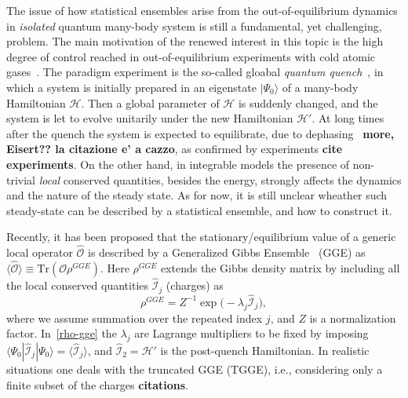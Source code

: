 \documentclass[twocolumn,superscriptaddress,prb,10pt]{revtex4-1}
\begin{document}
The issue of how statistical ensembles arise from the out-of-equilibrium 
dynamics in {\it isolated} quantum many-body system is still a fundamental, 
yet challenging, problem. The main motivation of the renewed interest 
in this topic is the high degree of control reached in out-of-equilibrium 
experiments with cold atomic gases~\cite{greiner-2002,kinoshita-2006,
hofferberth-2007,bloch-2008,trotzky-2012,gring-2012,cheneau-2012,
schneider-2012,kunhert-2013,langen-2013,meinert-2013,fukuhara-2013,
ronzheimer-2013,braun-2014}. 
The paradigm experiment is the so-called gloabal {\it quantum quench}~\cite{
polkovnikov-2011}, in which a system is initially prepared in an eigenstate 
$|\Psi_0\rangle$ of a many-body Hamiltonian ${\mathcal H}$. Then a global 
parameter of ${\mathcal H}$ is suddenly changed, and the system is let to evolve 
unitarily under the new Hamiltonian ${\mathcal H}'$. 
At long times after the quench the system is expected to equilibrate, due to 
dephasing~\cite{barthel-2008} {\bf more, Eisert??  la citazione e' a cazzo}, as confirmed by experiments {\bf cite experiments}. 
On the other hand, in integrable models the 
presence of non-trivial {\it local} conserved quantities, besides the energy, 
strongly affects the dynamics and the nature of the steady state. As for now,  
it is still unclear wheather such steady-state can be described by a statistical 
ensemble, and how to construct it. 

Recently, it has been proposed that the stationary/equilibrium value of a generic local 
operator $\hat{\mathcal O}$ is described by a Generalized Gibbs Ensemble~\cite{
rigol-2008} (GGE) as $\langle\hat{\mathcal O}\rangle\equiv\textrm{Tr}({\mathcal O}
\rho^{GGE})$. Here $\rho^{GGE}$ extends the Gibbs density matrix by including  all 
the local conserved quantities $\hat {\mathcal I}_j$ (charges) as 
%
\begin{equation}
\rho^{GGE}=Z^{-1}\exp\big(-\lambda_j\hat{\mathcal I}_j\big),
\label{rho-gge}
\end{equation}
%
where we assume summation over the repeated index $j$, and $Z$ is a normalization 
factor. In~\eqref{rho-gge} the $\lambda_j$ are Lagrange multipliers to be fixed 
by imposing $\langle\Psi_0|\hat{\mathcal I}_j|\Psi_0\rangle=\langle\hat{\mathcal 
I}_j\rangle$, and $\hat{\mathcal I}_2={\mathcal H}'$ is the post-quench Hamiltonian. 
In realistic situations one deals with the truncated GGE (TGGE), i.e., considering 
only a finite subset of the charges {\bf citations}. 
\end{document}
